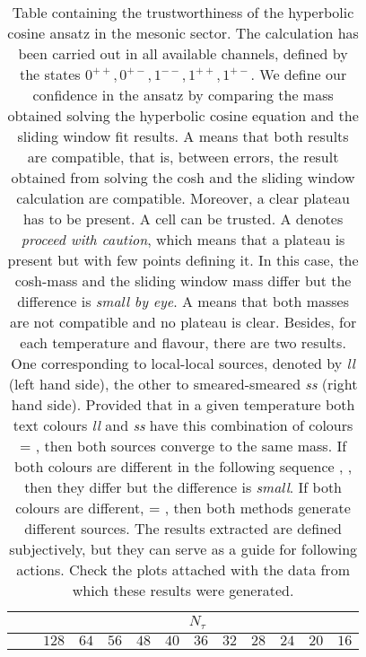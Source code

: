 \documentclass[10pt]{article}
\newcommand{\loq}{{\color[HTML]{006600}{ll}}}
\newcommand{\lon}{{\color[HTML]{800080}{ll}}}
\newcommand{\smq}{{\color[HTML]{006600}{ss}}}
\newcommand{\smn}{{\color[HTML]{800080}{ss}}}
\begin{document}
\begin{table}[H]
    \centering
    \Large
    \caption{
        Table containing the trustworthiness of the hyperbolic cosine
        ansatz in the mesonic sector. The calculation has been
        carried out in all available channels, defined by the states
        $0^{++}, 0^{+-}, 1^{--}, 1^{++}, 1^{+-}$. We define our
        confidence in the ansatz by comparing the mass obtained
        solving the hyperbolic cosine equation and the sliding window
        fit results. A {\color[HTML]{92D2D6}{blue cell}} means that
        both results are compatible, that is, between errors, the
        result obtained from solving the cosh and the sliding window
        calculation are compatible. Moreover, a clear plateau has to
        be present. A  {\color[HTML]{92D2D6}{blue cell}} cell can be
        trusted. A {\color[HTML]{FBAFB5}{pink cell}} denotes
        \textit{proceed with caution}, which means that a plateau is
        present but with few points defining it. In this case, the
        cosh-mass and the sliding window mass differ but the
        difference is \textit{small by eye}. A
        {\color[HTML]{F7CB4A}{yellow cell}} means that both masses
        are not compatible and no plateau is clear.  Besides, for
        each temperature and flavour, there are two results. One
        corresponding to local-local sources, denoted by \textit{ll}
        (left hand side), the other to smeared-smeared \textit{ss}
        (right hand side).  Provided that in a given temperature both
        text colours \textit{ll} and \textit{ss} have this
        combination of colours \loq = \smq, then both sources
        converge to the same mass. If both colours are different in
        the following sequence \loq, \smn, then they differ but the
        difference is \textit{small}.  If both colours are different,
        \lon = \smn, then both methods generate different sources.
        The results extracted are defined subjectively, but they can
        serve as a guide for following actions. Check the plots
        attached with the data from which these results were
        generated.
    }
    \vspace{0.5cm}
    \begin{adjustbox}{max width=\textwidth}
    \begin{tabular}{@{}cc|cc|cc|cc|cc|cc|cc|cc|cc|cc|cc|cc@{}}
        & & \multicolumn{22}{c}{$N_\tau$} \\
        \midrule
        & 
        & \multicolumn{2}{c}{$128$}
        & \multicolumn{2}{c}{$64$} 
        & \multicolumn{2}{c}{$56$} 
        & \multicolumn{2}{c}{$48$} 
        & \multicolumn{2}{c}{$40$} 
        & \multicolumn{2}{c}{$36$} 
        & \multicolumn{2}{c}{$32$} 
        & \multicolumn{2}{c}{$28$} 
        & \multicolumn{2}{c}{$24$} 
        & \multicolumn{2}{c}{$20$} 
        & \multicolumn{2}{c}{$16$} \\


\end{tabular}
\end{adjustbox}
\end{table}
\end{document}
